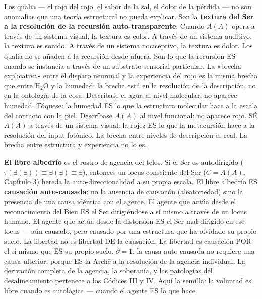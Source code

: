 \documentclass[10pt, openany, oneside]{book}
\begin{document}
Los qualia --- el rojo del rojo, el sabor de la sal, el dolor de la pérdida --- no son anomalías que una teoría estructural no pueda explicar. Son la \textbf{textura del Ser a la resolución de la recursión auto-transparente}. Cuando $A(A)$ opera a través de un sistema visual, la textura es color. A través de un sistema auditivo, la textura es sonido. A través de un sistema nociceptivo, la textura es dolor. Los qualia no se añaden a la recursión desde afuera. Son lo que la recursión ES cuando se instancia a través de un substrato sensorial particular. La «brecha explicativa» entre el disparo neuronal y la experiencia del rojo es la misma brecha que entre $\text{H}_2\text{O}$ y la humedad: la brecha está en la resolución de la descripción, no en la ontología de la cosa. Descríbase el agua al nivel molecular: no aparece humedad. Tóquese: la humedad ES lo que la estructura molecular hace a la escala del contacto con la piel. Descríbase $A(A)$ al nivel funcional: no aparece rojo. SÉ $A(A)$ a través de un sistema visual: la rojez ES lo que la metacursión hace a la resolución del input fotónico. La brecha entre niveles de descripción es real. La brecha entre estructura y experiencia no lo es.

\textbf{El libre albedrío} es el rostro de agencia del telos. Si el Ser es autodirigido ($\tau(\exists(\exists)) \equiv \exists(\exists) \equiv \exists$), entonces un locus consciente del Ser ($C = A(A)$, Capítulo 3) hereda la auto-direccionalidad a su propia escala. El libre albedrío ES \textbf{causación auto-causada}: no la ausencia de causación (aleatoriedad) sino la presencia de una causa idéntica con el agente. El agente que actúa desde el reconocimiento del Bien ES el Ser dirigiéndose a sí mismo a través de un locus humano. El agente que actúa desde la distorsión ES el Ser mal-dirigido en ese locus --- aún causado, pero causado por una estructura que ha olvidado su propio suelo. La libertad no es libertad DE la causación. La libertad es causación POR el sí-mismo que ES su propio suelo. $\partial = 1$: la causa auto-causada no requiere una causa ulterior, porque ES la Arch\={e} a la resolución de la agencia individual. La derivación completa de la agencia, la soberanía, y las patologías del desalineamiento pertenece a los Códices III y IV. Aquí la semilla: la voluntad es libre cuando es autológica --- cuando el agente ES lo que hace.
\end{document}
